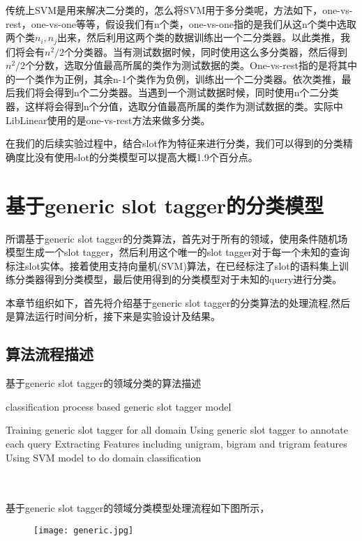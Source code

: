 \documentclass[master]{njuthesis}
\begin{document}
    传统上SVM是用来解决二分类的，怎么将SVM用于多分类呢，方法如下，one-vs-rest，one-vs-one等等\cite{MultiSVM}，假设我们有n个类，one-vs-one指的是我们从这n个类中选取两个类$n_i,n_j$出来，然后利用这两个类的数据训练出一个二分类器。以此类推，我们将会有$n^2/2$个分类器。当有测试数据时候，同时使用这么多分类器，然后得到$n^2/2$个分数，选取分值最高所属的类作为测试数据的类。One-vs-rest指的是将其中的一个类作为正例，其余n-1个类作为负例，训练出一个二分类器。依次类推，最后我们将会得到n个二分类器。当遇到一个测试数据时候，同时使用n个二分类器，这样将会得到n个分值，选取分值最高所属的类作为测试数据的类。实际中LibLinear使用的是one-vs-rest方法来做多分类。
    
在我们的后续实验过程中，结合slot作为特征来进行分类，我们可以得到的分类精确度比没有使用slot的分类模型可以提高大概1.9个百分点。

\section{基于generic slot tagger的分类模型}

    所谓基于generic slot tagger的分类算法，首先对于所有的领域，使用条件随机场模型生成一个slot tagger，然后利用这个唯一的slot tagger对于每一个未知的查询标注slot实体。接着使用支持向量机(SVM)算法，在已经标注了slot的语料集上训练分类器得到分类模型，最后使用得到的分类模型对于未知的query进行分类。
    
    本章节组织如下，首先将介绍基于generic slot tagger的分类算法的处理流程,然后是算法运行时间分析，接下来是实验设计及结果。

\subsection{算法流程描述}

    基于generic slot tagger的领域分类的算法描述\\
    \begin{algorithm}
      \caption{classification process based generic slot tagger model}\label{GST}
      \begin{algorithmic}[1]
       \State Training generic slot tagger for all domain
       \State Using generic slot tagger to annotate each query
      \EndProcedure
       \State Extracting Features including unigram, bigram and trigram features 
      \EndProcedure
       \State Using SVM model to do domain classification
      \EndProcedure
    \end{algorithmic}
    \end{algorithm}
\\
\\
    基于generic slot tagger的领域分类模型处理流程如下图所示，
    \begin{figure}[htbp]
      \centering
      \texttt{[image: generic.jpg]}
      \caption{}\label{fig:test1}
    \end{figure}
    
\end{document}
